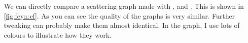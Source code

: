 
We can directly compare a scattering graph made with
, \Package{\TikZ} and .
This is shown in \cref{fig:feyn:cf}.
As you can see the quality of the graphs is very similar.
Further tweaking can probably make them almost identical.
In the  graph, I use lots of colours to illustrate how they work.

